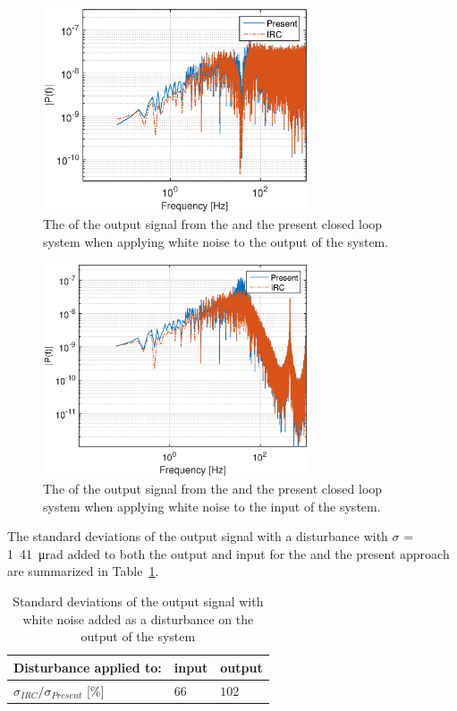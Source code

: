 \begin{figure}[h!]
  \centering
  \includegraphics[width=0.7\textwidth]{fig/matlab/whitenoiseoutput.eps}
  \caption{\label{fig:fft_in} The \abbrFFT of the output signal from the \abbrIRC and the present closed loop system when applying white noise to the output of the system.}
\end{figure}

\begin{figure}[h!]
  \centering
  \includegraphics[width=0.7\textwidth]{fig/matlab/whitenoiseinput.eps}
  \caption{\label{fig:fft_out} The \abbrFFT of the output signal from the \abbrIRC and the present closed loop system when applying white noise to the input of the system.}
\end{figure}


The standard deviations of the output signal with a disturbance with $\sigma$ = \unit{1.41\micro\radian} added to both the output and input for the \abbrIRC and the present approach are summarized in Table~\ref{tab:std}.

\begin{table}[h!]
  \centering
  \begin{tabular}{| l | l | l |}
    \hline
    Disturbance applied to: & input & output \\ \hline
      $\sigma_{IRC}/\sigma_{Present}$ [\%] & $66$  & $ 102$ \\
    \hline
  \end{tabular}
  \caption{\label{tab:std} Standard deviations of the output signal with white noise added as a disturbance on the output of the system}
\end{table}

